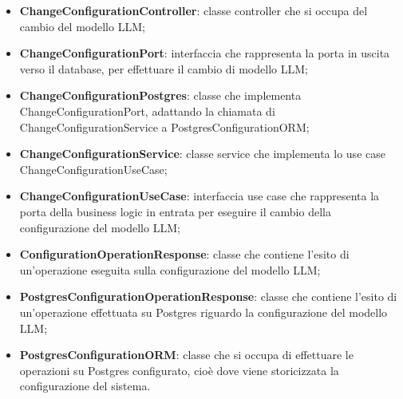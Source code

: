 \documentclass[10pt, a4paper]{article}
\begin{document}
\begin{itemize}
    \item \label{ChangeConfigurationController}\textbf{ChangeConfigurationController}: classe controller che si occupa del cambio del modello LLM;
    \item \label{ChangeConfigurationPort}\textbf{ChangeConfigurationPort}: interfaccia che rappresenta la porta in uscita verso il database, per effettuare il cambio di modello LLM;
    \item \label{ChangeConfigurationPostgres}\textbf{ChangeConfigurationPostgres}: classe che implementa ChangeConfigurationPort, adattando la chiamata di ChangeConfigurationService a PostgresConfigurationORM;
    \item \label{ChangeConfigurationService}\textbf{ChangeConfigurationService}: classe service che implementa lo use case ChangeConfigurationUseCase;
    \item \label{ChangeConfigurationUseCase}\textbf{ChangeConfigurationUseCase}: interfaccia use case che rappresenta la porta della business logic in entrata per eseguire il cambio della configurazione del modello LLM;
    \item \label{ConfigurationOperationResponse}\textbf{ConfigurationOperationResponse}:  classe che contiene l'esito di un'operazione eseguita sulla configurazione del modello LLM;
    \item \label{PostgresConfigurationOperationResponse}\textbf{PostgresConfigurationOperationResponse}: classe che contiene l'esito di un'operazione effettuata su Postgres riguardo la configurazione del modello LLM;
    \item \label{PostgresConfigurationORM}\textbf{PostgresConfigurationORM}: classe che si occupa di effettuare le operazioni su Postgres configurato, cioè dove viene storicizzata la configurazione del sistema.


\end{itemize}
\end{document}
